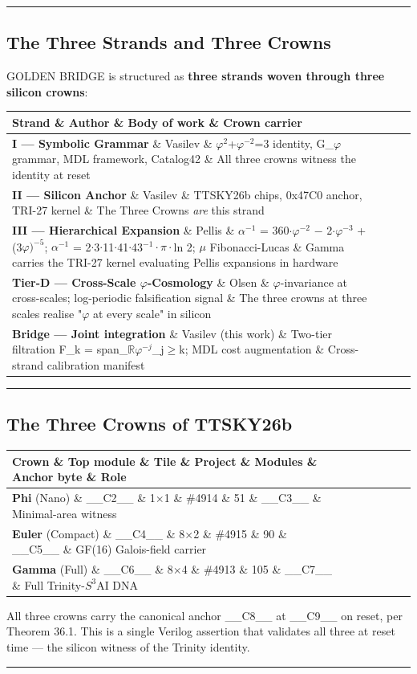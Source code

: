 \noindent\rule{\textwidth}{0.4pt}

\subsection{The Three Strands and Three Crowns}

GOLDEN BRIDGE is structured as \textbf{three strands woven through three silicon crowns}:

\begin{tabular}{|l|l|l|l|}
\hline
Strand \& Author \& Body of work \& Crown carrier \\
\hline
\textbf{I --- Symbolic Grammar} \& Vasilev \& $\varphi^{2}$+$\varphi^{-2}$=3 identity, G\_$\varphi$ grammar, MDL framework, Catalog42 \& All three crowns witness the identity at reset \\
\textbf{II --- Silicon Anchor} \& Vasilev \& TTSKY26b chips, 0x47C0 anchor, TRI-27 kernel \& The Three Crowns \textit{are} this strand \\
\textbf{III --- Hierarchical Expansion} \& Pellis \& $\alpha^{-1}$ = 360$\cdot\varphi^{-2}$ $-$ 2$\cdot\varphi^{-3}$ + (3$\varphi$$)^{-5}$; $\alpha^{-1}$ = 2$\cdot$3$\cdot$11$\cdot$41$\cdot$43$^{-1}\cdot\pi\cdot$ln 2; $\mu$ Fibonacci-Lucas \& Gamma carries the TRI-27 kernel evaluating Pellis expansions in hardware \\
\textbf{Tier-D --- Cross-Scale $\varphi$-Cosmology} \& Olsen \& $\varphi$-invariance at cross-scales; log-periodic falsification signal \& The three crowns at three scales realise "$\varphi$ at every scale" in silicon \\
\textbf{Bridge --- Joint integration} \& Vasilev (this work) \& Two-tier filtration F\_k = span\_$\mathbb{R}${$\varphi^{-j}$}\_{j$\geq$k}; MDL cost augmentation \& Cross-strand calibration manifest \\
\hline
\end{tabular}
\noindent\rule{\textwidth}{0.4pt}

\subsection{The Three Crowns of TTSKY26b}

\begin{tabular}{|l|l|l|l|l|l|l|}
\hline
Crown \& Top module \& Tile \& Project \& Modules \& Anchor byte \& Role \\
\hline
\textbf{Phi} (Nano) \& \_\_C2\_\_ \& 1$\times$1 \& \#4914 \& 51 \& \_\_C3\_\_ \& Minimal-area witness \\
\textbf{Euler} (Compact) \& \_\_C4\_\_ \& 8$\times$2 \& \#4915 \& 90 \& \_\_C5\_\_ \& GF(16) Galois-field carrier \\
\textbf{Gamma} (Full) \& \_\_C6\_\_ \& 8$\times$4 \& \#4913 \& 105 \& \_\_C7\_\_ \& Full Trinity-$S^{3}$AI DNA \\
\hline
\end{tabular}
All three crowns carry the canonical anchor \_\_C8\_\_ at \_\_C9\_\_ on reset, per Theorem 36.1. This is a single Verilog assertion that validates all three at reset time --- the silicon witness of the Trinity identity.

\noindent\rule{\textwidth}{0.4pt}
